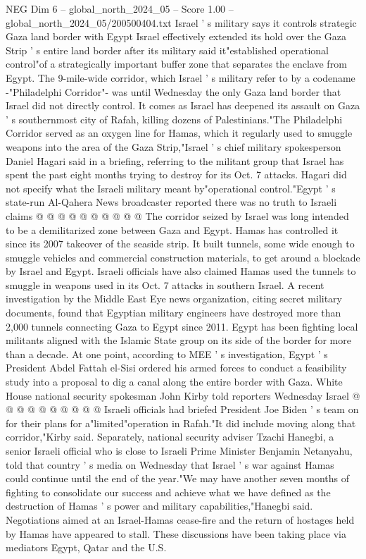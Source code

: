 \begin{textsample}{NEG Dim 6 – global\_north\_2024\_05 – Score 1.00 – global\_north\_2024\_05/200500404.txt}  \label{ex:f6_neg_305}
Israel ' s military says it controls strategic Gaza land border with Egypt Israel effectively extended its hold over the Gaza Strip ' s entire land border after its military said it"established operational control"of a strategically important buffer zone that separates the enclave from Egypt.
The 9-mile-wide corridor, which Israel ' s military refer to by a codename -"Philadelphi Corridor"- was until Wednesday the only Gaza land border that Israel did not directly control.
It comes as Israel has deepened its assault on Gaza ' s southernmost city of Rafah, killing dozens of Palestinians."The Philadelphi Corridor served as an oxygen line for Hamas, which it regularly used to smuggle weapons into the area of the Gaza Strip,"Israel ' s chief military spokesperson Daniel Hagari said in a briefing, referring to the militant group that Israel has spent the past eight months trying to destroy for its Oct. 7 attacks.
Hagari did not specify what the Israeli military meant by"operational control."Egypt ' s state-run Al-Qahera News broadcaster reported there was no truth to Israeli claims @ @ @ @ @ @ @ @ @ @ The corridor seized by Israel was long intended to be a demilitarized zone between Gaza and Egypt.
Hamas has controlled it since its 2007 takeover of the seaside strip.
It built tunnels, some wide enough to smuggle vehicles and commercial construction materials, to get around a blockade by Israel and Egypt.
Israeli officials have also claimed Hamas used the tunnels to smuggle in weapons used in its Oct. 7 attacks in southern Israel.
A recent investigation by the Middle East Eye news organization, citing secret military documents, found that Egyptian military engineers have destroyed more than 2,000 tunnels connecting Gaza to Egypt since 2011.
Egypt has been fighting local militants aligned with the Islamic State group on its side of the border for more than a decade.
At one point, according to MEE ' s investigation, Egypt ' s President Abdel Fattah el-Sisi ordered his armed forces to conduct a feasibility study into a proposal to dig a canal along the entire border with Gaza.
White House national security spokesman John Kirby told reporters Wednesday Israel @ @ @ @ @ @ @ @ @ @ Israeli officials had briefed President Joe Biden ' s team on for their plans for a"limited"operation in Rafah."It did include moving along that corridor,"Kirby said.
Separately, national security adviser Tzachi Hanegbi, a senior Israeli official who is close to Israeli Prime Minister Benjamin Netanyahu, told that country ' s media on Wednesday that Israel ' s war against Hamas could continue until the end of the year."We may have another seven months of fighting to consolidate our success and achieve what we have defined as the destruction of Hamas ' s power and military capabilities,"Hanegbi said.
Negotiations aimed at an Israel-Hamas cease-fire and the return of hostages held by Hamas have appeared to stall.
These discussions have been taking place via mediators Egypt, Qatar and the U.S.

\end{textsample}
